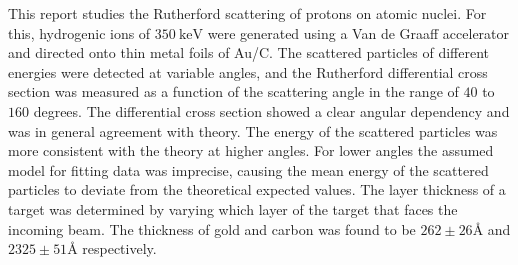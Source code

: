 This report studies the Rutherford scattering of protons on atomic
nuclei. For this, hydrogenic ions of $\SI{350}{\kilo\electronvolt}$ were
generated using
a Van de Graaff accelerator and directed onto thin metal foils of Au/C. The
scattered particles of different energies were detected at variable angles,
and the Rutherford differential cross section was measured as a function of
the scattering angle in the range of $40$ to $160$ degrees.
The differential cross section showed a clear angular dependency and was in
general agreement with theory. The energy of the scattered particles was more
consistent with the theory at higher angles. For lower angles the assumed model
for fitting data was
imprecise, causing the mean energy of the scattered particles to deviate from
the theoretical expected values.
The layer thickness of a target was determined by varying which layer of the
target that faces the incoming beam. The thickness of gold and carbon was found
to be $262\pm26\si{\angstrom}$ and $2325\pm51\si{\angstrom}$ respectively.



